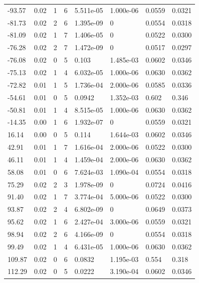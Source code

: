 \documentclass[preview]{standalone}
\begin{document}
{{\begin{tabular}{L{1.2cm}C{1.2cm} C{0.3cm}C{0.5cm} C{1.4cm}C{1.4cm} C{1.4cm}C{1.4cm}}
  -93.57  &  0.02  & 1     &  6 &  5.511e-05  & 1.000e-06  & 0.0559 &  0.0321   \\ 
  -81.73  &  0.02  & 2     &  6 &  1.395e-09  & 0  & 0.0554 &  0.0318   \\ 
  -81.09  &  0.02  & 1     &  7 &  1.406e-05  & 0  & 0.0522 &  0.0300   \\ 
  -76.28  &  0.02  & 2     &  7 &  1.472e-09  & 0  & 0.0517 &  0.0297   \\ 
  -76.08  &  0.02  & 0     &  5 &  0.103  & 1.485e-03  & 0.0602 &  0.0346   \\ 
  -75.13  &  0.02  & 1     &  4 &  6.032e-05  & 1.000e-06  & 0.0630 &  0.0362   \\ 
  -72.82  &  0.01  & 1     &  5 &  1.736e-04  & 2.000e-06  & 0.0585 &  0.0336   \\ 
  -54.61  &  0.01  & 0     &  5 &  0.0942  & 1.352e-03  & 0.602 &  0.346   \\ 
  -50.81  &  0.01  & 1     &  4 &  8.515e-05  & 1.000e-06  & 0.0630 &  0.0362   \\ 
  -14.35  &  0.00  & 1     &  6 &  1.932e-07  & 0  & 0.0559 &  0.0321   \\ 
  16.14  &  0.00  & 0     &  5 &  0.114  & 1.644e-03  & 0.0602 &  0.0346   \\ 
  42.91  &  0.01  & 1     &  7 &  1.616e-04  & 2.000e-06  & 0.0522 &  0.0300   \\ 
  46.11  &  0.01  & 1     &  4 &  1.459e-04  & 2.000e-06  & 0.0630 &  0.0362   \\ 
  58.08  &  0.01  & 0     &  6 &  7.624e-03  & 1.090e-04  & 0.0554 &  0.0318   \\ 
  75.29  &  0.02  & 2     &  3 &  1.978e-09  & 0  & 0.0724 &  0.0416   \\ 
  91.40  &  0.02  & 1     &  7 &  3.774e-04  & 5.000e-06  & 0.0522 &  0.0300   \\ 
  93.87  &  0.02  & 2     &  4 &  6.802e-09  & 0  & 0.0649 &  0.0373   \\ 
  95.62  &  0.02  & 1     &  6 &  2.427e-04  & 3.000e-06  & 0.0559 &  0.0321   \\ 
  98.94  &  0.02  & 2     &  6 &  4.166e-09  & 0  & 0.0554 &  0.0318   \\ 
  99.49  &  0.02  & 1     &  4 &  6.431e-05  & 1.000e-06  & 0.0630 &  0.0362   \\ 
  109.87  &  0.02  & 0     &  6 &  0.0832  & 1.195e-03  & 0.554 &  0.318   \\ 
  112.29  &  0.02  & 0     &  5 &  0.0222  & 3.190e-04  & 0.0602 &  0.0346   \\ 

\end{tabular}}}
\end{document}
